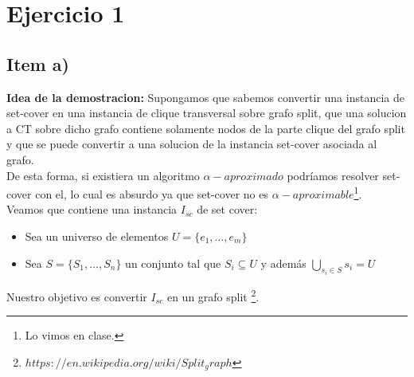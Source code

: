 \documentclass[10pt,a4paper]{article}
\begin{document}

\fecha{\today}



\maketitle

\tableofcontents
\newpage

\section{Ejercicio 1}

\subsection{Item a)}
\textbf{Idea de la demostracion:} Supongamos que sabemos convertir una instancia de set-cover en una instancia de clique transversal sobre grafo split, que una solucion a CT sobre dicho grafo contiene solamente nodos de la parte clique del grafo split y que se puede convertir a una solucion de la instancia set-cover asociada al grafo.\\

De esta forma, si existiera un algoritmo $\alpha-aproximado$ podríamos resolver set-cover con el, lo cual es absurdo ya que set-cover no es $\alpha-aproximable$\footnote{Lo vimos en clase.}.\\

Veamos que contiene una instancia $I_{sc}$ de set cover:
\begin{itemize}
    \item Sea un universo de elementos $U = \{e_1, \dots, e_m\}$
    \item Sea $S = \{S_1, \dots, S_n\}$ un conjunto tal que $S_i \subseteq U$ y además $\bigcup\limits_{s_i \in S} s_{i} = U$
\end{itemize}

Nuestro objetivo es convertir $ I_{sc} $ en un grafo split \footnote{$https://en.wikipedia.org/wiki/Split_graph$}.\\
\end{document}
